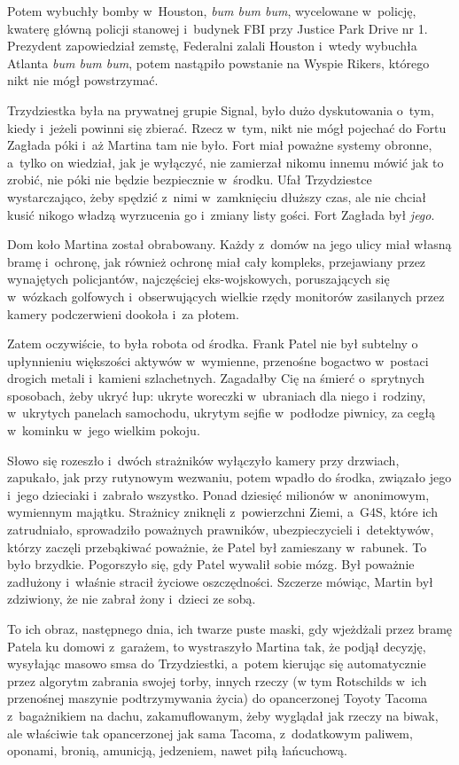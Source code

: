 \documentclass[oneside,polish,11pt,sfheadings]{mwbk}
\begin{document}
Potem wybuchły bomby w~Houston, \textit{bum bum bum}, wycelowane w~policję, kwaterę główną policji stanowej i~budynek FBI przy Justice Park
Drive nr 1. Prezydent zapowiedział zemstę, Federalni zalali Houston i~wtedy wybuchła Atlanta \textit{bum bum bum}, potem nastąpiło powstanie na
Wyspie Rikers, którego nikt nie mógł powstrzymać.

Trzydziestka była na prywatnej grupie Signal, było dużo dyskutowania o~tym, kiedy i~jeżeli powinni się zbierać. Rzecz w~tym, nikt nie mógł
pojechać do Fortu Zagłada póki i~aż Martina tam nie było. Fort miał
poważne systemy obronne, a~tylko on wiedział, jak je wyłączyć, nie
zamierzał nikomu innemu mówić jak to zrobić, nie póki nie będzie
bezpiecznie w~środku. Ufał Trzydziestce wystarczająco, żeby spędzić z~nimi w~zamknięciu dłuższy czas, ale nie chciał kusić nikogo władzą
wyrzucenia go i~zmiany listy gości. Fort Zagłada był \textit{jego}.

Dom koło Martina został obrabowany. Każdy z~domów na jego ulicy miał
własną bramę i~ochronę, jak również ochronę miał cały kompleks,
przejawiany przez wynajętych policjantów, najczęściej eks-wojskowych,
poruszających się w~wózkach golfowych i~obserwujących wielkie rzędy
monitorów zasilanych przez kamery podczerwieni dookoła i~za płotem.

Zatem oczywiście, to była robota od środka. Frank Patel nie był subtelny
o upłynnieniu większości aktywów w~wymienne, przenośne bogactwo w~postaci drogich metali i~kamieni szlachetnych. Zagadałby Cię na śmierć o~sprytnych sposobach, żeby ukryć łup: ukryte woreczki w~ubraniach dla
niego i~rodziny, w~ukrytych panelach samochodu, ukrytym sejfie w~podłodze piwnicy, za cegłą w~kominku w~jego wielkim pokoju.

Słowo się rozeszło i~dwóch strażników wyłączyło kamery przy drzwiach,
zapukało, jak przy rutynowym wezwaniu, potem wpadło do środka, związało
jego i~jego dzieciaki i~zabrało wszystko. Ponad dziesięć milionów w~anonimowym, wymiennym majątku. Strażnicy zniknęli z~powierzchni Ziemi, a~G4S, które ich zatrudniało, sprowadziło poważnych prawników,
ubezpieczycieli i~detektywów, którzy zaczęli przebąkiwać poważnie, że
Patel był zamieszany w~rabunek. To było brzydkie. Pogorszyło się, gdy
Patel wywalił sobie mózg. Był poważnie zadłużony i~właśnie stracił
życiowe oszczędności. Szczerze mówiąc, Martin był zdziwiony, że nie
zabrał żony i~dzieci ze sobą.

To ich obraz, następnego dnia, ich twarze puste maski, gdy wjeżdżali
przez bramę Patela ku domowi z~garażem, to wystraszyło Martina tak, że
podjął decyzję, wysyłając masowo smsa do Trzydziestki, a~potem kierując
się automatycznie przez algorytm zabrania swojej torby, innych rzeczy (w
tym Rotschilds w~ich przenośnej maszynie podtrzymywania życia) do
opancerzonej Toyoty Tacoma z~bagażnikiem na dachu, zakamuflowanym, żeby
wyglądał jak rzeczy na biwak, ale właściwie tak opancerzonej jak sama
Tacoma, z~dodatkowym paliwem, oponami, bronią, amunicją, jedzeniem,
nawet piłą łańcuchową.
\end{document}
